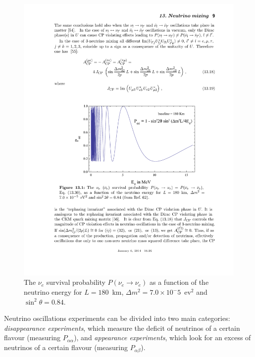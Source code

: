 \begin{figure}
    \centering
    \includegraphics[width=0.7\linewidth]{figures/oscillation.pdf}
    \caption{The $\nu_e$ survival probability $P(\nu_e\rightarrow\nu_e)$ as a function of the neutrino energy for $L=180$~km, $\Delta m^2 = 7.0 \times 10^-5$~ev$^2$ and $\sin^2\theta = 0.84$.}
    \label{fig:oscillation}
\end{figure}

Neutrino oscillations experiments can be divided into two main categories: \emph{disappearance experiments}, which measure the deficit of neutrinos of a certain flavour (measuring $P_{\alpha\alpha}$), and \emph{appearance experiments}, which look for an excess of neutrinos of a certain flavour (measuring $P_{\alpha\beta}$).

